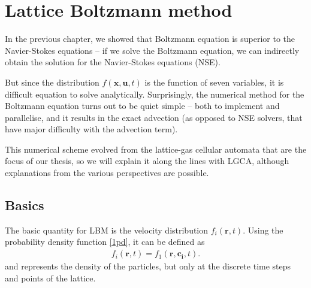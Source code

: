 \chapter{Lattice Boltzmann method}

In the previous chapter, we showed that Boltzmann equation is superior to the Navier-Stokes equations -- if we solve the Boltzmann equation, we can indirectly obtain the solution for the Navier-Stokes equations (NSE).

But since the distribution $f(\bm{x},\bm{u},t)$ is the function of seven variables, it is difficult equation to solve analytically.
Surprisingly, the numerical method for the Boltzmann equation turns out to be quiet simple -- both to implement and parallelise, and it results in the exact advection (as opposed to NSE solvers, that have major difficulty with the advection term). 

This numerical scheme evolved from the lattice-gas cellular automata that are the focus of our thesis, so we will explain it along the lines with LGCA, although explanations from the various perspectives are possible.


%
\section{Basics}
The basic quantity for LBM is the velocity distribution $f_i(\bm{r},t)$.
Using the probability density function \ref{1pd}, it can be defined as
\begin{align*}
f_i(\bm{r},t) = f_1(\bm{r}, \bm{c_i}, t).
\end{align*}
and represents the density of the particles, but only at the discrete time steps and points of the lattice.


